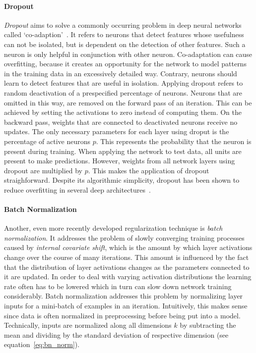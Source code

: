 \paragraph{Dropout}

\textit{Dropout} aims to solve a commonly occurring problem in deep neural networks
called `co-adaption'~\cite{Hinton2012a}.
It refers to neurons that detect features whose usefulness can not be isolated,
but is dependent on the detection of other features.
Such a neuron is only helpful in conjunction with other neuron.
Co-adaptation can cause overfitting, because it creates an opportunity for
the network to model patterns in the training data in an excessively detailed
way.
Contrary, neurons should learn to detect features that are useful in isolation.
Applying dropout refers to random deactivation of a prespecified percentage
of neurons.
Neurons that are omitted in this way, are removed on the forward pass of an
iteration.
This can be achieved by setting the activations to zero instead of computing
them.
On the backward pass, weights that are connected to deactivated neurons receive
no updates.
The only necessary parameters for each layer using droput is the percentage
of active neurons $p$.
This represents the probability that the neuron is present during training.
When applying the network to test data, all units are present to make predictions.
However, weights from all network layers using dropout are multiplied by $p$.
This makes the application of dropout straighforward.
Despite its algorithmic simplicity, dropout has been shown to reduce overfitting
in several deep architectures~\cite{Srivastava2014}.

\paragraph{Batch Normalization}

Another, even more recently developed regularization technique is \textit{batch
normalization}.
It addresses the problem of slowly converging training processes caused by
\textit{internal covariate shift}, which is the amount by which layer activations
change over the course of many iterations.
This amount is influenced by the fact that the distribution of layer activations changes
as the parameters connected to it are updated.
In order to deal with varying activation distributions the learning rate often
has to be lowered which in turn can slow down network training considerably.
Batch normalization addresses this problem by normalizing layer inputs for
a mini-batch of examples in an iteration.
Intuitively, this makes sense since data is often normalized in preprocessing
before being put into a model.
Technically, inputs are normalized along all dimensions $k$ by subtracting the mean
and dividing by the standard deviation of respective dimension (see equation~\ref{eq:bn_norm}).

